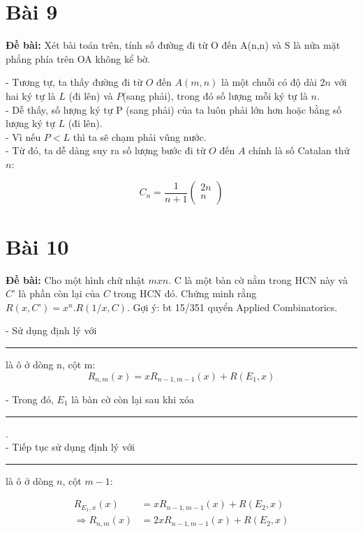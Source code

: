 \documentclass[12pt]{article}
\newcommand\crule[3][black]{\textcolor{#1}{\rule{#2}{#3}}}
\begin{document}
\begin{sloppypar}
\section{Bài 9}
\begin{tcolorbox}
    \textbf{Đề bài:} Xét bài toán trên, tính số đường đi từ O đến A(n,n) và S là nửa mặt phẳng phía trên OA không kể bờ.
\end{tcolorbox}

- Tương tự, ta thấy đường đi từ \(O\) đến \(A(m,n)\) là một chuỗi có độ dài \(2n\) với hai ký tự là \(L\) (đi lên) và \(P\)(sang phải), trong đó số lượng mỗi ký tự là \(n\). \\
- Dễ thấy, số lượng ký tự P (sang phải) của ta luôn phải lớn hơn hoặc bằng số lượng ký tự \(L\) (đi lên). \\
- Vì nếu \(P < L\) thì ta sẽ chạm phải vũng nước. \\
- Từ đó, ta dễ dàng suy ra số lượng bước đi từ \(O\) đến \(A\) chính là số Catalan thứ \(n\):

\begin{equation*}
    C_{n} = \frac{1}{n+1}\begin{pmatrix} 2n \\ n \\ \end{pmatrix}
\end{equation*}

\section{Bài 10}
\begin{tcolorbox}
    \textbf{Đề bài:} Cho một hình chữ nhật \(mxn\). C là một bàn cờ nằm trong HCN này và \(C’\) là phần còn lại của \(C\) trong HCN đó.
    Chứng minh rằng \(R(x,C’)=x^{n} .R(1/x,C)\). Gợi ý: bt 15/351 quyển Applied Combinatorics.
\end{tcolorbox}

- Sử dụng định lý với \crule[cyan]{0.3cm}{0.3cm} là ô ở dòng n, cột m:
\begin{equation*}
    R_{n,m}(x) = xR_{n-1,m-1}(x) + R(E_{1},x)
\end{equation*}

- Trong đó, \(E_{1}\) là bàn cờ còn lại sau khi xóa \crule[cyan]{0.3cm}{0.3cm}. \\
- Tiếp tục sử dụng định lý với \crule[cyan]{0.3cm}{0.3cm} là ô ở dòng \(n\), cột \(m-1\): 

\begin{align*}
    R_{E_{1},x}(x) & = xR_{n-1,m-1}(x) + R(E_{2},x) \\
    \Rightarrow R_{n,m}(x) & = 2xR_{n-1,m-1}(x) + R(E_{2},x) 
\end{align*}


\end{sloppypar}
\end{document}
